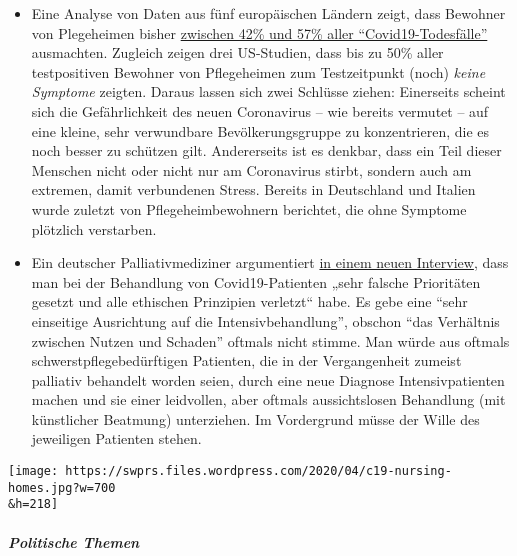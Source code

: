 \begin{itemize}
\tightlist
\item
  Eine Analyse von Daten aus fünf europäischen Ländern zeigt, dass
  Bewohner von Plegeheimen bisher
  \href{https://ltccovid.org/2020/04/12/mortality-associated-with-covid-19-outbreaks-in-care-homes-early-international-evidence/}{zwischen
  42\% und 57\% aller ``Covid19-Todesfälle''} ausmachten. Zugleich
  zeigen drei US-Studien, dass bis zu 50\% aller testpositiven Bewohner
  von Pflegeheimen zum Testzeitpunkt (noch) \emph{keine Symptome}
  zeigten. Daraus lassen sich zwei Schlüsse ziehen: Einerseits scheint
  sich die Gefährlichkeit des neuen Coronavirus -- wie bereits vermutet
  -- auf eine kleine, sehr verwundbare Bevölkerungs­gruppe zu
  konzentrieren, die es noch besser zu schützen gilt. Andererseits ist
  es denkbar, dass ein Teil dieser Menschen nicht oder nicht nur am
  Coronavirus stirbt, sondern auch am extremen, damit verbundenen
  Stress. Bereits in Deutschland und Italien wurde zuletzt von
  Pflegeheimbewohnern berichtet, die ohne Symptome plötzlich verstarben.
\item
  Ein deutscher Palliativmediziner argumentiert
  \href{https://www.deutschlandfunk.de/palliativmediziner-zu-covid-19-behandlungen-sehr-falsche.694.de.html?dram:article_id=474488}{in
  einem neuen Interview}, dass man bei der Behandlung von
  Covid19-Patienten „sehr falsche Prioritäten gesetzt und alle ethischen
  Prinzipien verletzt`` habe. Es gebe eine ``sehr einseitige Ausrichtung
  auf die Intensivbehandlung'', obschon ``das Verhältnis zwischen Nutzen
  und Schaden'' oftmals nicht stimme. Man würde aus oftmals
  schwerstpflegebedürftigen Patienten, die in der Vergangenheit zumeist
  palliativ behandelt worden seien, durch eine neue Diagnose
  Intensivpatienten machen und sie einer leidvollen, aber oftmals
  aussichtslosen Behandlung (mit künstlicher Beatmung) unterziehen. Im
  Vordergrund müsse der Wille des jeweiligen Patienten stehen.
\end{itemize}

\texttt{[image: https://swprs.files.wordpress.com/2020/04/c19-nursing-homes.jpg?w=700\\\&h=218]}

\hypertarget{politische-themen}{%
\subparagraph{\texorpdfstring{\textbf{Politische
Themen}}{Politische Themen}}\label{politische-themen}}

